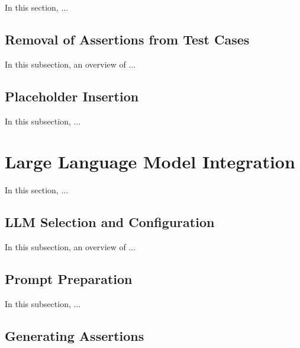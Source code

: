 In this section, ...

\vspace{0.1 cm}
\subsection{Removal of Assertions from Test Cases}
\label{sec:assertion_removal}
\vspace{0.1 cm}

In this subsection, an overview of ...

\vspace{0.1 cm}
\subsection{Placeholder Insertion}
\label{sec:placeholder_insertion}
\vspace{0.1 cm}

In this subsection, ...

\section{Large Language Model Integration}
\label{sec:llm_integration}
\vspace{0.2 cm}

In this section, ...

\vspace{0.1 cm}
\subsection{LLM Selection and Configuration}
\label{sec:llm_configurations}
\vspace{0.1 cm}

In this subsection, an overview of ...

\vspace{0.1 cm}
\subsection{Prompt Preparation}
\label{sec:prompt_preparation}
\vspace{0.1 cm}

In this subsection, ...

\vspace{0.1 cm}
\subsection{Generating Assertions}
\label{sec:generating_assertions}
\vspace{0.1 cm}

